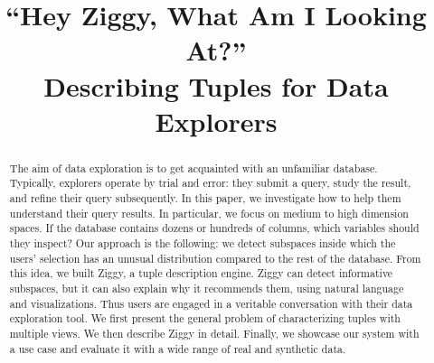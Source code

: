 \documentclass{sig-alternate-2015}
\begin{document}
\title{``Hey Ziggy, What Am I Looking At?''\\
Describing Tuples for Data Explorers}


\maketitle

\begin{abstract} 
The aim of data exploration is to get acquainted with an unfamiliar database.
Typically, explorers operate by trial and error: they submit a query, study the
result, and refine their query subsequently. In this paper, we investigate how
to help them understand their query results. In particular, we focus on medium
to high dimension spaces. If the database contains dozens or hundreds of
columns, which variables should they inspect? Our approach is the following: we
detect subspaces inside which the users' selection has an unusual distribution
compared to the rest of the database. From this idea, we built Ziggy, a tuple
description engine. Ziggy can detect informative subspaces, but it can also
explain why it recommends them, using natural language and visualizations. Thus
users are engaged in a veritable conversation with their data exploration tool.
We first present the general problem of characterizing tuples with multiple
views. We then describe Ziggy in detail. Finally, we showcase our system with a
use case and evaluate it with a wide range of real and synthetic data.
\end{abstract}






\balance

\end{document}
